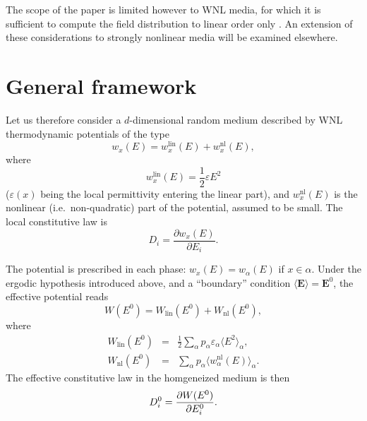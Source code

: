 The scope of the paper is limited however to WNL media, for which it 
is sufficient to compute the field distribution to linear order only 
\cite{AHAR87,STRO88}. An extension of these considerations to 
strongly nonlinear media will be examined elsewhere.  

\section{General framework}
\label{th}
Let us therefore consider a $d$-dimensional random medium described 
by WNL thermodynamic potentials of the type
\begin{equation}
\label{orig}
w_x(E)=w_x^{\text{lin}}(E) +w_x^{\text{nl}}(E),
\end{equation}
where 
\begin{equation}
w_x^{\text{lin}}(E)=\frac{1}{2} \varepsilon E^2
\end{equation}
($\varepsilon(x)$ being the local permittivity entering the linear part), 
and $w_x^{\text{nl}}(E)$ is the nonlinear (i.e.\ non-quadratic) part of 
the potential, assumed to be small. The local constitutive law is
\begin{equation}
D_i=\frac{\partial w_x(E)}{\partial E_i}. 
\end{equation}

The potential is prescribed in each phase: $w_x(E)=w_\alpha(E)$ if $x\in\alpha$. 
Under the ergodic hypothesis introduced above, and a ``boundary'' condition    
\cite{NOTE1} $\langle {\mathbf{E}}\rangle={\mathbf{E}}^0$, the effective 
potential reads
\begin{equation}
W(E^0)=W_{\text{lin}}(E^0)+W_{\text{nl}}(E^0),
\end{equation}
where
\begin{eqnarray}
\label{lin}
W_{\text{lin}}(E^0)&=&\frac{1}{2}\sum_\alpha p_\alpha \varepsilon_\alpha 
\langle E^2\rangle_\alpha,\\
\label{nonlin}
W_{\text{nl}}(E^0)&=&\sum_\alpha p_\alpha \langle w_\alpha^{\text{nl}}(E)
\rangle_\alpha.
\end{eqnarray}  
The effective constitutive law in the homgeneized medium is then
\begin{equation}
\label{constithom}
D^0_i={\partial W(E^0)\over \partial E^0_i}.
\end{equation}


